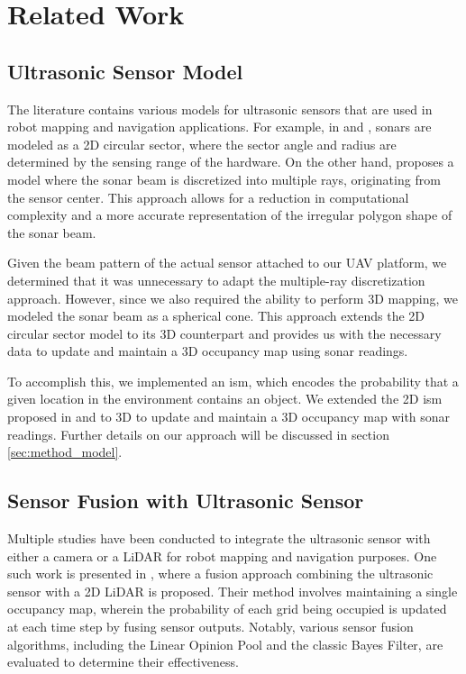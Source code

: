 \section{Related Work}
\label{sec:related work}


\subsection{Ultrasonic Sensor Model}
The literature contains various models for ultrasonic sensors that are used in robot mapping and navigation applications. For example, in \cite{mapping2017} and \cite{advanced_sonar_sensor}, sonars are modeled as a 2D circular sector, where the sector angle and radius are determined by the sensing range of the hardware. On the other hand, \cite{multiray} proposes a model where the sonar beam is discretized into multiple rays, originating from the sensor center. This approach allows for a reduction in computational complexity and a more accurate representation of the irregular polygon shape of the sonar beam.

Given the beam pattern of the actual sensor attached to our UAV platform, we determined that it was unnecessary to adapt the multiple-ray discretization approach. However, since we also required the ability to perform 3D mapping, we modeled the sonar beam as a spherical cone. This approach extends the 2D circular sector model to its 3D counterpart and provides us with the necessary data to update and maintain a 3D occupancy map using sonar readings.

To accomplish this, we implemented an \gls{ism}, which encodes the probability that a given location in the environment contains an object. We extended the 2D \gls{ism} proposed in \cite{advanced_sonar_sensor} and \cite{wideanglesonar} to 3D to update and maintain a 3D occupancy map with sonar readings. Further details on our approach will be discussed in section \ref{sec:method_model}.

\subsection{Sensor Fusion with Ultrasonic Sensor}
Multiple studies have been conducted to integrate the ultrasonic sensor with either a camera or a LiDAR for robot mapping and navigation purposes. One such work is presented in \cite{lidarfusion}, where a fusion approach combining the ultrasonic sensor with a 2D LiDAR is proposed. Their method involves maintaining a single occupancy map, wherein the probability of each grid being occupied is updated at each time step by fusing sensor outputs. Notably, various sensor fusion algorithms, including the Linear Opinion Pool and the classic Bayes Filter, are evaluated to determine their effectiveness.

